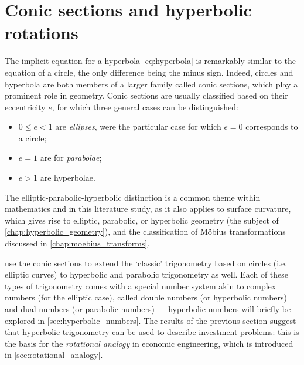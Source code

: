 \section{Conic sections and hyperbolic rotations}
\label{sec:hyperbolic_rotations}
The implicit equation for a hyperbola \cref{eq:hyperbola} is remarkably similar to the equation of a circle, the only difference being the minus sign. Indeed, circles and hyperbola are both members of a larger family called conic sections, which play a prominent role in geometry. Conic sections are usually classified based on their eccentricity $e$, for which three general cases can be distinguished:
\begin{itemize}[itemsep=0.3ex,topsep=0.3ex]
    \item $0 \leq e < 1$ are \emph{ellipses}, were the particular case for which $e = 0$ corresponds to a circle;
    \item $e = 1$ are for \emph{parabolae};
    \item $e > 1$ are hyperbolae.
\end{itemize}
The elliptic-parabolic-hyperbolic distinction is a common theme within mathematics and in this literature study, as it also applies to surface curvature, which gives rise to elliptic, parabolic, or hyperbolic geometry (the subject of \cref{chap:hyperbolic_geometry}), and the classification of Möbius transformations discussed in \cref{chap:moebius_transforms}.

\citet{Harkin2004} use the conic sections to extend the `classic' trigonometry based on circles (i.e. elliptic curves) to hyperbolic and parabolic trigonometry as well. Each of these types of trigonometry comes with a special number system akin to complex numbers (for the elliptic case), called double numbers (or hyperbolic numbers) and dual numbers (or parabolic numbers) --- hyperbolic numbers will briefly be explored in \cref{sec:hyperbolic_numbers}. The results of the previous section suggest that hyperbolic trigonometry can be used to describe investment problems: this is the basis for the \emph{rotational analogy} in economic engineering, which is introduced in \cref{sec:rotational_analogy}.

